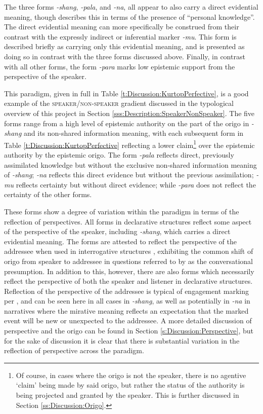 The three forms \textit{-shang}, \textit{-pala}, and \textit{-na}, all appear to also carry a direct evidential meaning, though  describes this in terms of the presence of ``personal knowledge''. The direct evidential meaning can more specifically be construed from their contrast with the expressly indirect or inferential marker \textit{-mu}. This form is described briefly as carrying only this evidential meaning, and is presented as doing so in contrast with the three forms discussed above. Finally, in contrast with all other forms, the form \textit{-para} marks low epistemic support from the perspective of the speaker.

This paradigm, given in full in Table \ref{t:Discussion:KurtopPerfective}, is a good example of the \textsc{speaker/non-speaker} gradient discussed in the typological overview of this project in Section \ref{sss:Description:SpeakerNonSpeaker}. The five forms range from a high level of epistemic authority on the part of the origo in \textit{-shang} and its non-shared information meaning, with each subsequent form in Table \ref{t:Discussion:KurtopPerfective} reflecting a lower claim\footnote{Of course, in cases where the origo is not the speaker, there is no agentive `claim' being made by said origo, but rather the status of the authority is being projected and granted by the speaker. This is further discussed in Section \ref{ss:Discussion:Origo}.} over the epistemic authority by the epistemic origo. The form \textit{-pala} reflects direct, previously assimilated knowledge but without the exclusive non-shared information meaning of \textit{-shang}; \textit{-na} reflects this direct evidence but without the previous assimilation; \textit{-mu} reflects certainty but without direct evidence; while \textit{-para} does not reflect the certainty of the other forms.

These forms show a degree of variation within the paradigm in terms of the reflection of perspectives. All forms in declarative structures reflect some aspect of the perspective of the speaker, including \textit{-shang}, which carries a direct evidential meaning. The forms are attested to reflect the perspective of the addressee when used in interrogative structures \cite{Hyslop2018}, exhibiting the common shift of origo from speaker to addressee in questions referred to by  as the conversational presumption. In addition to this, however, there are also forms which necessarily reflect the perspective of both the speaker and listener in declarative structures. Reflection of the perspective of the addressee is typical of engagement marking per , and can be seen here in all cases in \textit{-shang}, as well as potentially in \textit{-na} in narratives where the mirative meaning reflects an expectation that the marked event will be new or unexpected to the addressee. A more detailed discussion of perspective and the origo can be found in Section \ref{s:Discussion:Perspective}, but for the sake of discussion it is clear that there is substantial variation in the reflection of perspective across the paradigm.

